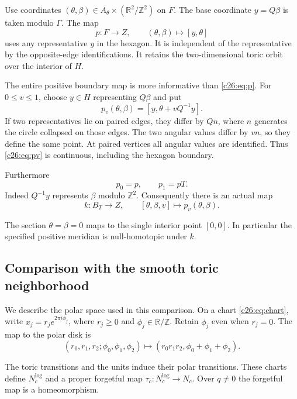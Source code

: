 Use coordinates $(\theta,\beta)\in A_\theta\times(\mathbb R^2/\mathbb Z^2)$
on $F$. The base coordinate $y=Q\beta$ is taken modulo $\Gamma$.
The map
\begin{equation}\label{c26:eq:p}
p:F\longrightarrow Z,
\qquad (\theta,\beta)\longmapsto[y,\theta]
\end{equation}
uses any representative $y$ in the hexagon.
It is independent of the representative by the opposite-edge identifications.
It retains the two-dimensional toric orbit over the interior of $H$.

The entire positive boundary map is more informative than \eqref{c26:eq:p}.
For $0\le v\le1$, choose $y\in H$ representing $Q\beta$ and put
\begin{equation}\label{c26:eq:pv}
p_v(\theta,\beta)=[y,\theta+vQ^{-1}y].
\end{equation}
If two representatives lie on paired edges, they differ by $Qn$,
where $n$ generates the circle collapsed on those edges.
The two angular values differ by $vn$, so they define the same point.
At paired vertices all angular values are identified.
Thus \eqref{c26:eq:pv} is continuous, including the hexagon boundary.

Furthermore
\begin{equation}\label{c26:eq:endpoints}
p_0=p,\qquad p_1=pT.
\end{equation}
Indeed $Q^{-1}y$ represents $\beta$ modulo $\mathbb Z^2$.
Consequently there is an actual map
\begin{equation}\label{c26:eq:k}
k:B_T\longrightarrow Z,\qquad [\theta,\beta,v]\longmapsto p_v(\theta,\beta).
\end{equation}

The section $\theta=\beta=0$ maps to the single interior point $[0,0]$.
In particular the specified positive meridian is null-homotopic under $k$.

\subsection{Comparison with the smooth toric neighborhood}

We describe the polar space used in this comparison.
On a chart \eqref{c26:eq:chart}, write
$x_j=r_je^{2\pi i\phi_j}$, where $r_j\ge0$ and
$\phi_j\in\mathbb R/\mathbb Z$. Retain $\phi_j$ even when $r_j=0$.
The map to the polar disk is
\[
(r_0,r_1,r_2;\phi_0,\phi_1,\phi_2)
\longmapsto(r_0r_1r_2,\phi_0+\phi_1+\phi_2).
\]

The toric transitions and the units induce their polar transitions.
These charts define $N_c^{\log}$ and a proper forgetful map
$\tau_c:N_c^{\log}\to N_c$.
Over $q\ne0$ the forgetful map is a homeomorphism.

